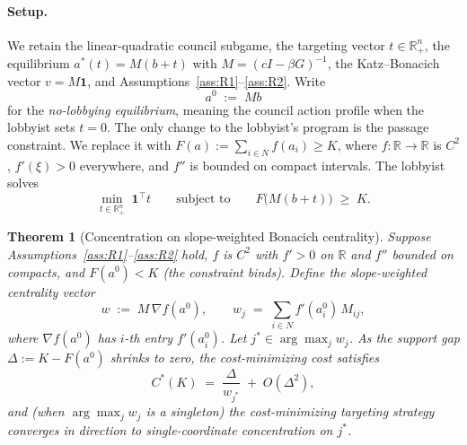 \documentclass[11pt,letterpaper]{article}
\theoremstyle{plain}
\newtheorem{theorem}{Theorem}
\theoremstyle{definition}
\theoremstyle{remark}
\begin{document}
\paragraph{Setup.} We retain the linear-quadratic council subgame, the targeting vector $t \in \mathbb{R}^n_+$, the equilibrium $a^*(t) = M(b + t)$ with $M = (cI - \beta G)^{-1}$, the Katz--Bonacich vector $v = M\mathbf{1}$, and Assumptions~\ref{ass:R1}--\ref{ass:R2}. Write
\[
a^0 \;:=\; M b
\]
for the \emph{no-lobbying equilibrium}, meaning the council action profile when the lobbyist sets $t = 0$. The only change to the lobbyist's program is the passage constraint. We replace it with $F(a) := \sum_{i \in N} f(a_i) \geq K$, where $f : \mathbb{R} \to \mathbb{R}$ is $C^2$, $f'(\xi) > 0$ everywhere, and $f''$ is bounded on compact intervals. The lobbyist solves
\begin{equation}
\min_{t \in \mathbb{R}^n_+} \;\mathbf{1}^\top t \qquad \text{subject to} \qquad F\bigl(M(b + t)\bigr) \;\geq\; K.
\label{eq:smooth_lobby}
\end{equation}

\begin{theorem}[Concentration on slope-weighted Bonacich centrality]\label{thm:smoothvote}
Suppose Assumptions~\ref{ass:R1}--\ref{ass:R2} hold, $f$ is $C^2$ with $f' > 0$ on $\mathbb{R}$ and $f''$ bounded on compacts, and $F(a^0) < K$ (the constraint binds). Define the \emph{slope-weighted centrality vector}
\[
w \;:=\; M\, \nabla f(a^0), \qquad w_j \;=\; \sum_{i \in N} f'(a^0_i)\, M_{ij},
\]
where $\nabla f(a^0)$ has $i$-th entry $f'(a^0_i)$. Let $j^* \in \arg\max_j w_j$. As the support gap $\Delta := K - F(a^0)$ shrinks to zero, the cost-minimizing cost satisfies
\begin{equation}
C^*(K) \;=\; \frac{\Delta}{w_{j^*}} \;+\; O(\Delta^2),
\label{eq:smoothcost_main}
\end{equation}
and (when $\arg\max_j w_j$ is a singleton) the cost-minimizing targeting strategy converges in direction to single-coordinate concentration on $j^*$.
\end{theorem}
\end{document}
